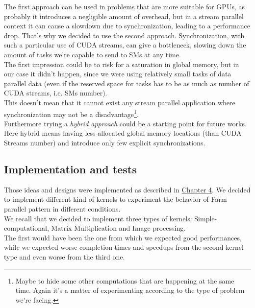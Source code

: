  The first approach can be used in problems that are more suitable for GPUs, as probably it introduces a negligible amount of overhead, but in a stream parallel context it can cause a slowdown due to synchronization, leading to a performance drop.
 That's why we decided to use the second approach. Synchronization, with such a particular use of CUDA streams, can give a bottleneck, slowing down the amount of tasks we're capable to send to SMs at any time.\\
 The first impression could be to risk for a saturation in global memory, but in our case it didn't happen, since we were using relatively small tasks of data parallel data (even if the reserved space for tasks has to be as much as number of CUDA streams, i.e. SMs number).\\
 This doesn't mean that it cannot exist any stream parallel application where synchronization may not be a disadvantage\footnote{Maybe to hide some other computations that are happening at the same time. Again it's a matter of experimenting according to the type of problem we're facing.}.\\
 Furthermore trying a \textit{hybrid approach} could be a starting point for future works.
 Here hybrid means having less allocated global memory locations (than CUDA Streams number) and introduce only few explicit synchronizations.\\
 
 
 \subsection{Implementation and tests}
 Those ideas and designs were implemented as described in \hyperref[chap:impl]{Chapter 4}. We decided to implement different kind of kernels to experiment the behavior of Farm parallel pattern in different conditions.\\
 We recall that we decided to implement three types of kernels: Simple-computational, Matrix Multiplication and Image processing.\\
 The first would have been the one from which we expected good performances, while we expected worse completion times and speedups from the second kernel type and even worse from the third one.
 
